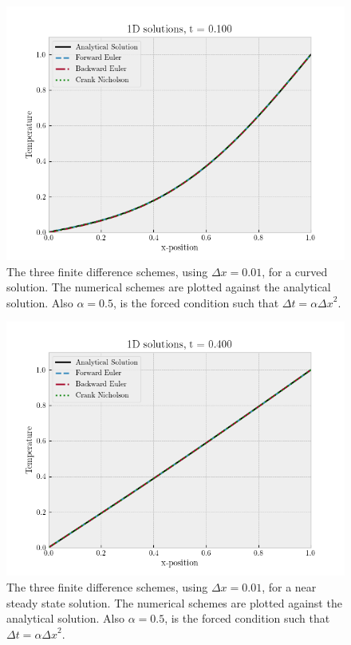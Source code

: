 \documentclass[%
reprint,
nofootinbib,
amsmath,amssymb,
aps,
]{revtex4-1}
\newcommand{\dt}{{\Delta t}}
\newcommand{\dx}{{\Delta x}}
\begin{document}
\begin{figure}
	\centering
	\includegraphics[width=0.95\linewidth]{./figures/plot1d01001.png}
	\caption{The three finite difference schemes, using $\dx = 0.01$, for a curved solution. The numerical schemes are plotted against the analytical solution. Also $\alpha = 0.5$, is the forced condition such that $\dt = \alpha\dx^2$.}
	\label{fig plot1d01001}
\end{figure}
\begin{figure}
	\centering
	\includegraphics[width=0.95\linewidth]{./figures/plot1d04001.png}
	\caption{The three finite difference schemes, using $\dx = 0.01$, for a near steady state solution. The numerical schemes are plotted against the analytical solution. Also $\alpha = 0.5$, is the forced condition such that $\dt = \alpha\dx^2$.}
	\label{fig plot1d04001}
\end{figure}
\end{document}
